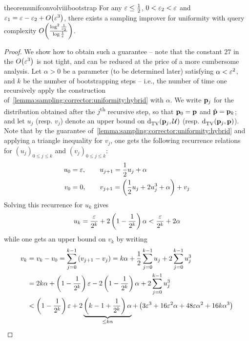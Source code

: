 \begin{restatable}{theorem}{unifconvolviiibootstrap}\label{lemma:sampling:corrector:uniformity:boostrap}
  For any $\varepsilon\leq \frac{1}{2}$, $0<\varepsilon_2<\varepsilon$ and $\eps_1=\eps-\eps_2+\bigO{\eps^3}$, there exists a sampling improver for uniformity with query complexity $\bigO{\frac{\log^2\frac{1}{\eps_2}}{\log\frac{1}{\eps}}}$.
\end{restatable}
\begin{proof}
We show how to obtain such a guarantee -- note that the constant $27$ in the $\bigO{\eps^3}$ is not tight, and can be reduced at the price of a more cumbersome analysis. Let $\alpha > 0$ be a parameter (to be determined later) satisfying $\alpha < \varepsilon^2$, and $k$ be the number of bootstrapping steps -- i.e., the number of time one recursively apply the construction of~\cref{lemma:sampling:corrector:uniformity:hybrid} with $\alpha$. We write $\mathbf{p}_j$ for the distribution obtained after the $j$\textsuperscript{th} recursive step, so that $\mathbf{p}_0=\mathbf{p}$ and $\hat{\mathbf{p}}=\mathbf{p}_k$; and let $u_j$ (resp. $v_j$) denote an upper bound on ${\operatorname{d}_{\textrm{TV}}^{}\!\left({\mathbf{p}_j, \mathcal{U}}\right)}$ (resp. ${\operatorname{d}_{\textrm{TV}}^{}\!\left({\mathbf{p}_j, \mathbf{p}}\right)}$). Note that by the guarantee of~\cref{lemma:sampling:corrector:uniformity:hybrid} and applying a triangle inequality for $v_j$, one gets the following recurrence relations for $(u_j)_{0\leq j\leq k}$ and $(v_j)_{0\leq j\leq k}$:
\begin{align*}
  u_0 &= \varepsilon,\qquad u_{j+1}=\frac{1}{2}u_j + \alpha\\
  v_0 &= 0,\qquad v_{j+1}=\left(\frac{1}{2}u_j + 2u_j^3+\alpha\right) + v_j
\end{align*}
Solving this recurrence for $u_k$ gives
\begin{equation}\label{eq:sampling:corrector:uniformity:boostrap:uk}
  u_k = \frac{\varepsilon}{2^k}+2\left( 1-\frac{1}{2^k} \right)\alpha < \frac{\varepsilon}{2^k}+2\alpha
\end{equation}
while one gets an upper bound on $v_k$ by writing
\begin{align*}
  v_k &= v_k -v_0 = \sum_{j=0}^{k-1} \left( v_{j+1} - v_j \right) = k\alpha + \frac{1}{2}\sum_{j=0}^{k-1} u_j + 2\sum_{j=0}^{k-1}u_j^3 \\
  &= 2k\alpha + \left( 1-\frac{1}{2^k} \right)\eps - 2\left( 1-\frac{1}{2^k} \right)\alpha + 2\sum_{j=0}^{k-1}u_j^3 \\
  &< \left( 1-\frac{1}{2^k} \right)\eps + 2\underbrace{\left( k-1+\frac{1}{2^k} \right)\alpha}_{\leq k\alpha} + \left( 3\eps^3+16\eps^2\alpha+48\eps\alpha^2+16k\alpha^3 \right)

\end{align*}
\end{proof}
